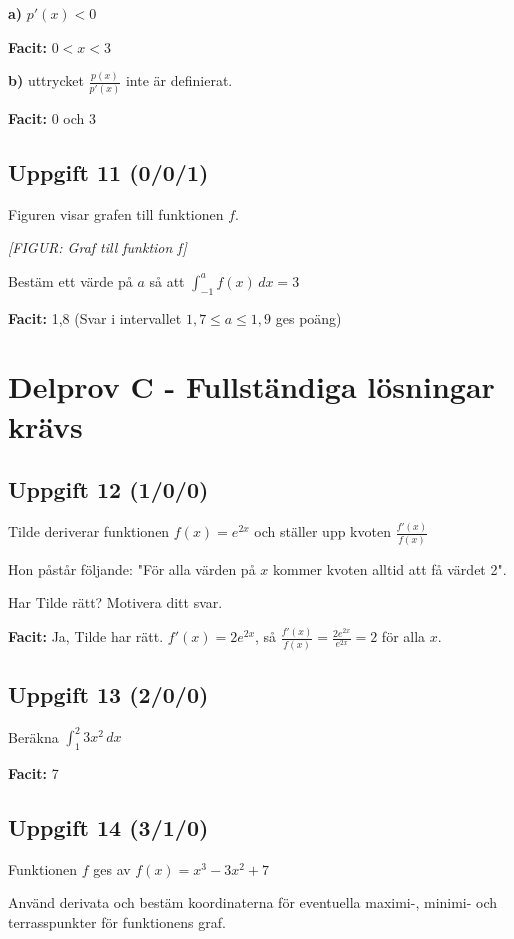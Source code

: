 \documentclass{article}
\begin{document}
\textbf{a)} $p'(x) < 0$

\textbf{Facit:} $0 < x < 3$

\textbf{b)} uttrycket $\frac{p(x)}{p'(x)}$ inte är definierat.

\textbf{Facit:} 0 och 3

\subsection*{Uppgift 11 (0/0/1)}
Figuren visar grafen till funktionen $f$.

\textit{[FIGUR: Graf till funktion f]}

Bestäm ett värde på $a$ så att $\int_{-1}^{a} f(x) \, dx = 3$

\textbf{Facit:} 1,8 (Svar i intervallet $1,7 \leq a \leq 1,9$ ges poäng)

\newpage

\section{Delprov C - Fullständiga lösningar krävs}

\subsection*{Uppgift 12 (1/0/0)}
Tilde deriverar funktionen $f(x) = e^{2x}$ och ställer upp kvoten $\frac{f'(x)}{f(x)}$

Hon påstår följande: "För alla värden på $x$ kommer kvoten alltid att få värdet 2".

Har Tilde rätt? Motivera ditt svar.

\textbf{Facit:} Ja, Tilde har rätt. $f'(x) = 2e^{2x}$, så $\frac{f'(x)}{f(x)} = \frac{2e^{2x}}{e^{2x}} = 2$ för alla $x$.

\subsection*{Uppgift 13 (2/0/0)}
Beräkna $\int_{1}^{2} 3x^2 \, dx$

\textbf{Facit:} 7

\subsection*{Uppgift 14 (3/1/0)}
Funktionen $f$ ges av $f(x) = x^3 - 3x^2 + 7$

Använd derivata och bestäm koordinaterna för eventuella maximi-, minimi- och terrasspunkter för funktionens graf.
\end{document}
